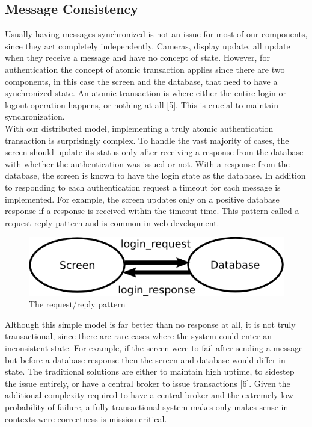 \documentclass[12pt]{report}
\begin{document}
\subsection*{Message Consistency}
Usually having messages synchronized is not an issue for most of our components, since they act completely independently. Cameras, display update, all update when they receive a message and have no concept of state. However, for authentication the concept of atomic transaction applies since there are two components, in this case the screen and the database, that need to have a synchronized state. An atomic transaction is where either the entire login or logout operation happens, or nothing at all [5]. This is crucial to maintain synchronization. \\
With our distributed model, implementing a truly atomic authentication transaction is surprisingly complex. To handle the vast majority of cases, the screen should update its status only after receiving a response from the database with whether the authentication was issued or not. With a response from the database, the screen is known to have the login state as the database. In addition to responding to each authentication request a timeout for each message is implemented. For example, the screen updates only on a positive database response if a response is received within the timeout time. This pattern called a request-reply pattern and is common in web development. \\

\begin{figure}[h]
\centering
\includegraphics[scale=0.55]{communication}
\caption{The request/reply pattern}
\end{figure}
\noindent
Although this simple model is far better than no response at all, it is not truly transactional, since there are rare cases where the system could enter an inconsistent state. For example, if the screen were to fail after sending a message but before a database response then the screen and database would differ in state. The traditional solutions are either to maintain high uptime, to sidestep the issue entirely, or have a central broker to issue transactions [6]. Given the additional complexity required to have a central broker and the extremely low probability of failure, a fully-transactional system makes only makes sense in contexts were correctness is mission critical.
\end{document}
